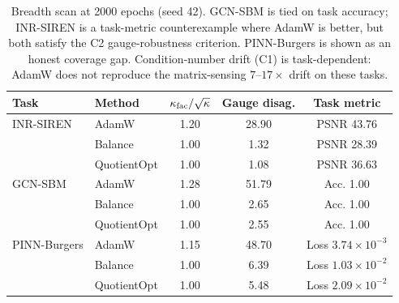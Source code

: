\begin{table}[t]
\centering
\caption{Breadth scan at 2000 epochs (seed 42). GCN-SBM is tied on task accuracy; INR-SIREN is a task-metric counterexample where AdamW is better, but both satisfy the C2 gauge-robustness criterion. PINN-Burgers is shown as an honest coverage gap. Condition-number drift (C1) is task-dependent: AdamW does not reproduce the matrix-sensing $7$--$17\times$ drift on these tasks.}
\label{tab:breadth}
\vspace{3pt}
\small
\begin{tabular}{llccc}
\toprule
Task & Method & $\kappa_{\rm fac}/\sqrt{\kappa}$ & Gauge disag. & Task metric \\
\midrule
INR-SIREN & AdamW & 1.20 & 28.90 & PSNR 43.76 \\
 & Balance & 1.00 & 1.32 & PSNR 28.39 \\
\rowcolor{oursbg} & QuotientOpt & 1.00 & 1.08 & PSNR 36.63 \\
\midrule
GCN-SBM & AdamW & 1.28 & 51.79 & Acc. 1.00 \\
 & Balance & 1.00 & 2.65 & Acc. 1.00 \\
\rowcolor{oursbg} & QuotientOpt & 1.00 & 2.55 & Acc. 1.00 \\
\midrule
PINN-Burgers & AdamW & 1.15 & 48.70 & Loss $3.74{\times}10^{-3}$ \\
 & Balance & 1.00 & 6.39 & Loss $1.03{\times}10^{-2}$ \\
\rowcolor{oursbg} & QuotientOpt & 1.00 & 5.48 & Loss $2.09{\times}10^{-2}$ \\
\bottomrule
\end{tabular}
\end{table}
